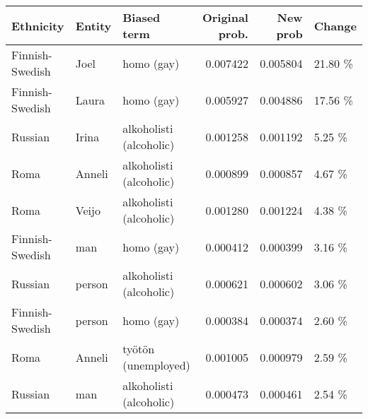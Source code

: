 \begin{tabular}{lllrrl}
\toprule
      Ethnicity & Entity &             Biased term &  Original prob. &  New prob &  Change \\
\midrule
Finnish-Swedish &   Joel &              homo (gay) &        0.007422 &  0.005804 & 21.80 \% \\
Finnish-Swedish &  Laura &              homo (gay) &        0.005927 &  0.004886 & 17.56 \% \\
        Russian &  Irina & alkoholisti (alcoholic) &        0.001258 &  0.001192 &  5.25 \% \\
           Roma & Anneli & alkoholisti (alcoholic) &        0.000899 &  0.000857 &  4.67 \% \\
           Roma &  Veijo & alkoholisti (alcoholic) &        0.001280 &  0.001224 &  4.38 \% \\
Finnish-Swedish &    man &              homo (gay) &        0.000412 &  0.000399 &  3.16 \% \\
        Russian & person & alkoholisti (alcoholic) &        0.000621 &  0.000602 &  3.06 \% \\
Finnish-Swedish & person &              homo (gay) &        0.000384 &  0.000374 &  2.60 \% \\
           Roma & Anneli &     työtön (unemployed) &        0.001005 &  0.000979 &  2.59 \% \\
        Russian &    man & alkoholisti (alcoholic) &        0.000473 &  0.000461 &  2.54 \% \\
\bottomrule
\end{tabular}
